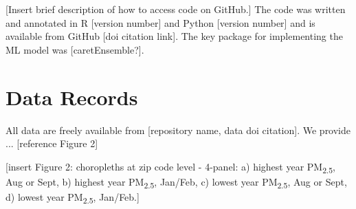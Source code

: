 \documentclass[english]{article}
\begin{document}

[Insert brief description of how to access code on GitHub.] The code was written and annotated in R [version number] and Python [version number] and is available from GitHub [doi citation link]. The key package for implementing the ML model was [caretEnsemble?]. 

\section*{Data Records}



All data are freely available from [repository name, data doi citation]. We provide ... [reference Figure 2]

[insert Figure 2: choropleths at zip code level - 4-panel: a) highest year PM\textsubscript{2.5}, Aug or Sept, b) highest year PM\textsubscript{2.5}, Jan/Feb, c) lowest year PM\textsubscript{2.5}, Aug or Sept, d) lowest year PM\textsubscript{2.5}, Jan/Feb.] %
\end{document}
